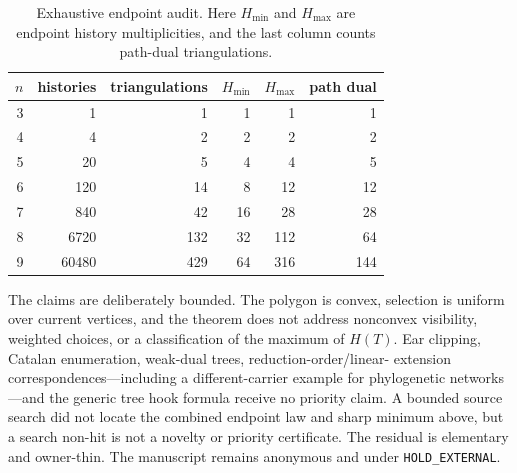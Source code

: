 \documentclass[a4paper,10pt]{amsart}
\theoremstyle{remark}
\begin{document}
\begin{table}[ht]
\centering
\small
\caption{Exhaustive endpoint audit.  Here $H_{\min}$ and $H_{\max}$ are
endpoint history multiplicities, and the last column counts path-dual
triangulations.}
\label{tab:audit}
\begin{tabular}{@{}rrrrrr@{}}
\toprule
$n$ & histories & triangulations & $H_{\min}$ & $H_{\max}$ & path dual \\
\midrule
3 & 1     & 1   & 1  & 1   & 1   \\
4 & 4     & 2   & 2  & 2   & 2   \\
5 & 20    & 5   & 4  & 4   & 5   \\
6 & 120   & 14  & 8  & 12  & 12  \\
7 & 840   & 42  & 16 & 28  & 28  \\
8 & 6720  & 132 & 32 & 112 & 64  \\
9 & 60480 & 429 & 64 & 316 & 144 \\
\bottomrule
\end{tabular}
\end{table}

The claims are deliberately bounded.  The polygon is convex, selection is
uniform over current vertices, and the theorem does not address nonconvex
visibility, weighted choices, or a classification of the maximum of $H(T)$.
Ear clipping, Catalan enumeration, weak-dual trees, reduction-order/linear-
extension correspondences---including a different-carrier example for
phylogenetic networks \citep{CoronadoPonsRiera2024}---and the generic tree
hook formula receive no priority claim.  A bounded source search did not locate the combined endpoint
law and sharp minimum above, but a search non-hit is not a novelty or priority
certificate.  The residual is elementary and owner-thin.  The manuscript
remains anonymous and under \texttt{HOLD\_EXTERNAL}.



\end{document}
